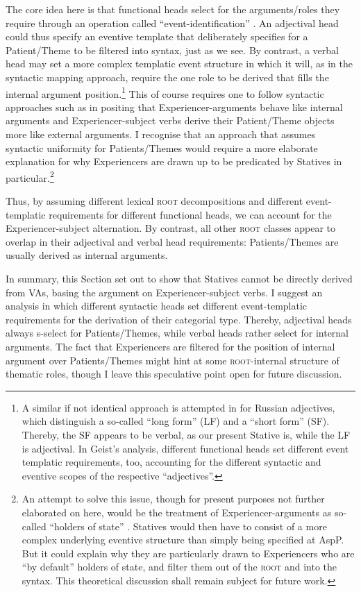 \documentclass[output=paper,colorlinks,citecolor=brown]{langscibook}
\begin{document}
The core idea here is that functional heads select for the arguments/roles they require through an operation called “event-identification” \citep[7]{irwin_semantic_2020}. An adjectival head could thus specify an eventive template that deliberately specifies for a Patient/Theme to be filtered into syntax, just as we see. By contrast, a verbal head may set a more complex templatic event structure in which it will, as in the syntactic mapping approach, require the one role to be derived that fills the internal argument position.\footnote{A similar if not identical approach is attempted in \citet{geist_argument_2010} for Russian adjectives, which distinguish a so-called “long form” (LF) and a “short form” (SF). Thereby, the SF appears to be verbal, as our present Stative is, while the LF is adjectival. In Geist's analysis, different functional heads set different event templatic requirements, too, accounting for the different syntactic and eventive scopes of the respective “adjectives”.} This of course requires one to follow syntactic approaches such as \citet{belletti_psych-verbs_1988,anagnostopoulou_experiencers_1999} in positing that Experiencer-arguments behave like internal arguments and  Experiencer-subject verbs derive their Patient/Theme objects more like external arguments. I recognise that an approach that assumes syntactic uniformity for Patients/Themes would require a more elaborate explanation for why Experiencers are drawn up to be predicated by Statives in particular.\footnote{An attempt to solve this issue, though for present purposes not further elaborated on here, would be the treatment of Experiencer-arguments as so-called “holders of state” \citep[204]{hirsch_german_2018}\label{ft:alternate_approach}. Statives would then have to consist of a more complex underlying eventive structure than simply being specified at AspP. But it could explain why they are particularly drawn to Experiencers who are “by default” holders of state, and filter them out of the \textsc{root} and into the syntax. This theoretical discussion shall remain subject for future work.} 


Thus, by assuming different lexical \textsc{root} decompositions and different event-templatic requirements for different functional heads, we can  account for the Experiencer-subject alternation. By contrast, all other \textsc{root} classes appear to overlap in their adjectival and verbal head requirements: Patients/Themes are usually derived as internal arguments. 


In summary, this Section set out to show that Statives cannot be directly derived from VAs, basing the argument on Experiencer-subject verbs. I suggest an analysis in which different syntactic heads set different event-templatic requirements for the derivation of their categorial type. Thereby, adjectival heads always s-select for Patients/Themes, while verbal heads rather select for internal arguments. The fact that Experiencers are filtered for the position of internal argument over Patients/Themes might hint at some \textsc{root}-internal structure of thematic roles, though I leave this speculative point open for future discussion.
\end{document}
